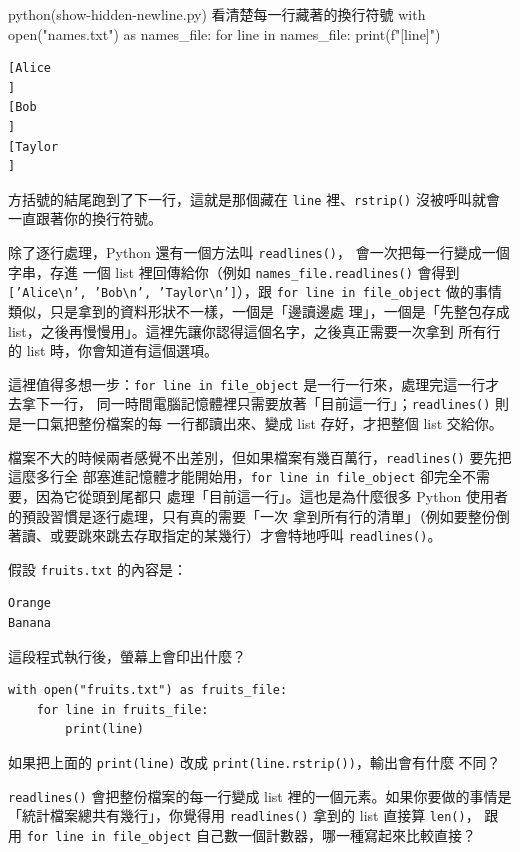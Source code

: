 \begin{example}{python}{(show-hidden-newline.py) 看清楚每一行藏著的換行符號}
with open("names.txt") as names_file:
    for line in names_file:
        print(f"[{line}]")
\end{example}

\begin{verbatim}
[Alice
]
[Bob
]
[Taylor
]
\end{verbatim}

方括號的結尾跑到了下一行，這就是那個藏在 \texttt{line} 裡、\texttt{rstrip()} 沒被呼叫就會
一直跟著你的換行符號。

除了逐行處理，Python 還有一個方法叫 \texttt{readlines()}，
會一次把每一行變成一個字串，存進
一個 list 裡回傳給你（例如 \texttt{names\_file.readlines()} 會得到
\texttt{['Alice\textbackslash n', 'Bob\textbackslash n', 'Taylor\textbackslash n']}），跟
\texttt{for line in file\_object} 做的事情類似，只是拿到的資料形狀不一樣，一個是「邊讀邊處
理」，一個是「先整包存成 list，之後再慢慢用」。這裡先讓你認得這個名字，之後真正需要一次拿到
所有行的 list 時，你會知道有這個選項。

這裡值得多想一步：\texttt{for line in file\_object} 是一行一行來，處理完這一行才去拿下一行，
同一時間電腦記憶體裡只需要放著「目前這一行」；\texttt{readlines()} 則是一口氣把整份檔案的每
一行都讀出來、變成 list 存好，才把整個 list 交給你。

檔案不大的時候兩者感覺不出差別，但如果檔案有幾百萬行，\texttt{readlines()} 要先把這麼多行全
部塞進記憶體才能開始用，\texttt{for line in file\_object} 卻完全不需要，因為它從頭到尾都只
處理「目前這一行」。這也是為什麼很多 Python 使用者的預設習慣是逐行處理，只有真的需要「一次
拿到所有行的清單」（例如要整份倒著讀、或要跳來跳去存取指定的某幾行）才會特地呼叫
\texttt{readlines()}。

\begin{drills}[label=drills:reading-files]
\item 假設 \texttt{fruits.txt} 的內容是：
\begin{verbatim}
Orange
Banana
\end{verbatim}
這段程式執行後，螢幕上會印出什麼？
\begin{verbatim}
with open("fruits.txt") as fruits_file:
    for line in fruits_file:
        print(line)
\end{verbatim}
\item 如果把上面的 \texttt{print(line)} 改成 \texttt{print(line.rstrip())}，輸出會有什麼
不同？
\item \texttt{readlines()} 會把整份檔案的每一行變成 list 裡的一個元素。如果你要做的事情是
「統計檔案總共有幾行」，你覺得用 \texttt{readlines()} 拿到的 list 直接算 \texttt{len()}，
跟用 \texttt{for line in file\_object} 自己數一個計數器，哪一種寫起來比較直接？
\end{drills}

